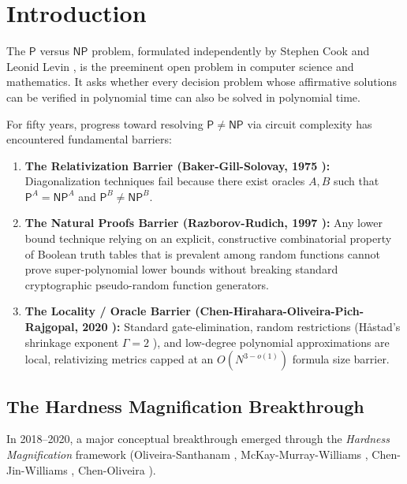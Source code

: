 \documentclass[11pt,letterpaper]{article}
\newcommand{\NP}{\mathsf{NP}}
\renewcommand{\P}{\mathsf{P}}
\begin{document}
\newpage
\tableofcontents
\newpage

\section{Introduction}

The $\P$ versus $\NP$ problem, formulated independently by Stephen Cook \cite{Coo71} and Leonid Levin \cite{Lev73}, is the preeminent open problem in computer science and mathematics. It asks whether every decision problem whose affirmative solutions can be verified in polynomial time can also be solved in polynomial time.

For fifty years, progress toward resolving $\P \neq \NP$ via circuit complexity has encountered fundamental barriers:
\begin{enumerate}
    \item \textbf{The Relativization Barrier (Baker-Gill-Solovay, 1975 \cite{BGS75}):} Diagonalization techniques fail because there exist oracles $A, B$ such that $\P^A = \NP^A$ and $\P^B \neq \NP^B$.
    \item \textbf{The Natural Proofs Barrier (Razborov-Rudich, 1997 \cite{RR97}):} Any lower bound technique relying on an explicit, constructive combinatorial property of Boolean truth tables that is prevalent among random functions cannot prove super-polynomial lower bounds without breaking standard cryptographic pseudo-random function generators.
    \item \textbf{The Locality / Oracle Barrier (Chen-Hirahara-Oliveira-Pich-Rajgopal, 2020 \cite{CHOPR20}):} Standard gate-elimination, random restrictions (H{\aa}stad's shrinkage exponent $\Gamma = 2$ \cite{Has86}), and low-degree polynomial approximations are local, relativizing metrics capped at an $O(N^{3-o(1)})$ formula size barrier.
\end{enumerate}

\subsection{The Hardness Magnification Breakthrough}

In 2018--2020, a major conceptual breakthrough emerged through the \emph{Hardness Magnification} framework (Oliveira-Santhanam \cite{OS18}, McKay-Murray-Williams \cite{MMW19}, Chen-Jin-Williams \cite{CJW19}, Chen-Oliveira \cite{CO20}). 
\end{document}
